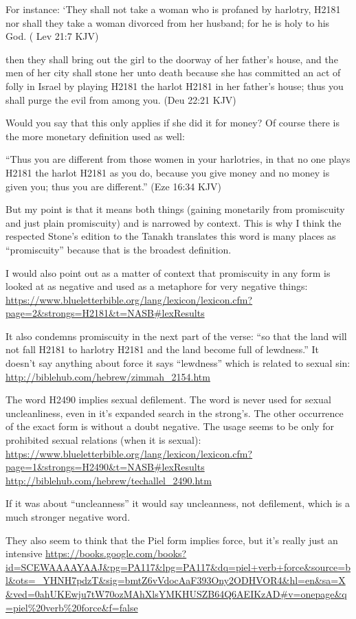 \documentclass[11pt]{article}
\begin{document}
For instance: ‘They shall not take a woman who is profaned by harlotry, H2181 nor shall they take a woman divorced from her husband; for he is holy to his God. ( Lev 21:7 KJV)

then they shall bring out the girl to the doorway of her father’s house, and the men of her city shall stone her unto death because she has committed an act of folly in Israel by playing H2181 the harlot H2181 in her father’s house; thus you shall purge the evil from among you. (Deu 22:21 KJV)

Would you say that this only applies if she did it for money? Of course there is the more monetary definition used as well:

“Thus you are different from those women in your harlotries, in that no one plays H2181 the harlot H2181 as you do, because you give money and no money is given you; thus you are different.” (Eze 16:34 KJV)

But my point is that it means both things (gaining monetarily from promiscuity and just plain promiscuity) and is narrowed by context. This is why I think the respected Stone’s edition to the Tanakh translates this word is many places as “promiscuity” because that is the broadest definition.

I would also point out as a matter of context that promiscuity in any form is looked at as negative and used as a metaphore for very negative things: \url{https://www.blueletterbible.org/lang/lexicon/lexicon.cfm?page=2&strongs=H2181&t=NASB#lexResults}

It also condemns promiscuity in the next part of the verse: 
“so that the land will not fall H2181 to harlotry H2181 and the land become full of lewdness.” It doesn’t say anything about force it says “lewdness” which is related to sexual sin: \url{http://biblehub.com/hebrew/zimmah_2154.htm}

The word H2490 implies sexual defilement. The word is never used for sexual uncleanliness, even in it’s expanded search in the strong’s. The other occurrence of the exact form is without a doubt negative. The usage seems to be only for prohibited sexual relations (when it is sexual):
\url{https://www.blueletterbible.org/lang/lexicon/lexicon.cfm?page=1&strongs=H2490&t=NASB#lexResults}
\url{http://biblehub.com/hebrew/techallel_2490.htm}

If it was about “uncleanness” it would say uncleanness, not defilement, which is a much stronger negative word.

They also seem to think that the Piel form implies force, but it’s really just an intensive
\url{https://books.google.com/books?id=SCEWAAAAYAAJ&pg=PA117&lpg=PA117&dq=piel+verb+force&source=bl&ots=_YHNH7pdzT&sig=bmtZ6vVdocAaF393Ony2ODHVOR4&hl=en&sa=X&ved=0ahUKEwju7tW70ozMAhXlsYMKHUSZB64Q6AEIKzAD#v=onepage&q=piel%20verb%20force&f=false}
\end{document}
